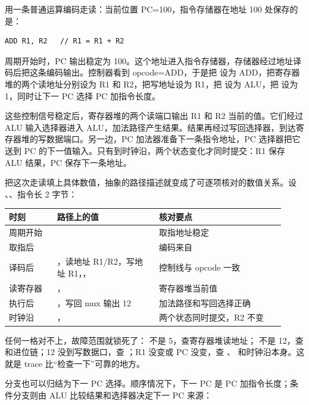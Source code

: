用一条普通运算编码走读：当前位置 PC=100，指令存储器在地址 100 处保存的是：

\begin{lstlisting}
ADD R1, R2   // R1 = R1 + R2
\end{lstlisting}

周期开始时，PC 输出稳定为 100。这个地址进入指令存储器，存储器经过地址译码后把这条编码输出。控制器看到 opcode=ADD，于是把  设为 ADD，把寄存器堆的两个读地址分别设为 R1 和 R2，把写地址设为 R1，把  设为 ALU，把  设为 1，同时让下一 PC 选择 PC 加指令长度。

这些控制信号稳定后，寄存器堆的两个读端口输出 R1 和 R2 当前的值。它们经过 ALU 输入选择器进入 ALU，加法路径产生结果。结果再经过写回选择器，到达寄存器堆的写数据端口。另一边，PC 加法器准备下一条指令地址，PC 选择器把它送到 PC 的下一值输入。只有到时钟沿，两个状态变化才同时提交：R1 保存 ALU 结果，PC 保存下一条地址。

把这次走读填上具体数值，抽象的路径描述就变成了可逐项核对的数值关系。设 、、指令长 2 字节：

\begin{longtable}{L{0.16\linewidth}L{0.34\linewidth}L{0.42\linewidth}}
\toprule
时刻 & 路径上的值 & 核对要点 \\
\midrule
周期开始 &  & 取指地址稳定 \\\tablerowrule
取指后 &  & 编码来自  \\\tablerowrule
译码后 & ，读地址 R1/R2，写地址 R1，， & 控制线与 opcode 一致 \\\tablerowrule
读寄存器 & ， & 寄存器堆当前值 \\\tablerowrule
执行后 & ，写回 mux 输出 12 & 加法路径和写回选择正确 \\\tablerowrule
时钟沿 & ， & 两个状态同时提交，R2 不变 \\
\bottomrule
\end{longtable}

任何一格对不上，故障范围就锁死了： 不是 5，查寄存器堆读地址； 不是 12，查  和进位链；12 没到写数据口，查 ；R1 没变或 PC 没变，查 、 和时钟沿本身。这就是 trace 比“检查一下”可靠的地方。

分支也可以归结为下一 PC 选择。顺序情况下，下一 PC 是 PC 加指令长度；条件分支则由 ALU 比较结果和选择器决定下一 PC 来源：

